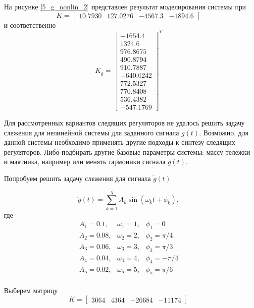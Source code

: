 На рисунке \ref{5_g_nonlin_2} представлен результат моделирования системы при 
\begin{equation}
	K = \begin{bmatrix}
		10.7930& 127.0276& -4567.3 &-1894.6
	\end{bmatrix}
\end{equation}
и соответственно
\begin{equation}
	K_g = \begin{bmatrix}
		-1654.4\\	1324.6\\	976.8675\\	490.8794\\	910.7887\\	-640.0242\\	772.5327\\	770.8408\\	536.4382\\	-547.1769
	\end{bmatrix}^T
\end{equation}


Для рассмотренных вариантов следящих регуляторов не удалось решить задачу слежения для нелинейной системы для заданного сигнала $g(t)$. Возможно, для данной системы необходимо применять другие подходы к синтезу следящих регуляторов. Либо подбирать другие базовые параметры системы: массу тележки и маятника, например или менять гармоники сигнала $g(t)$. 

Попробуем решить задачу слежения для сигнала $\tilde{g}(t)$

\begin{equation}
	\tilde{g}(t) = \sum \limits_{k=1}^5 A_k \sin(\omega_kt+\phi_k),
\end{equation}
где
\begin{equation}
	\begin{matrix}
		A_1 = 0.1, & \omega_1 = 1, & \phi_1 = 0\\
		A_2 = 0.08, & \omega_2 = 2, & \phi_2 = \pi /4\\
		A_3 = 0.06, & \omega_3 = 3, & \phi_3 = \pi /3\\
		A_4 = 0.04, & \omega_4 = 4, & \phi_4 = -\pi/4\\
		A_5= 0.02, & \omega_5 = 5, & \phi_5 = \pi / 6\\
	\end{matrix}
\end{equation}

Выберем матрицу  $$K = \begin{bmatrix}
3064& 4364& -26684& -11174
\end{bmatrix}$$


